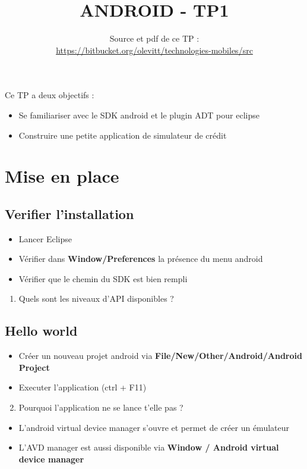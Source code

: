 \documentclass{article}
\title{ANDROID - TP1}
\date{Source et pdf de ce TP
:\\ \href{https://bitbucket.org/olevitt/technologies-mobiles}{https://bitbucket.org/olevitt/technologies-mobiles/src}}
\begin{document}
\maketitle
Ce TP a deux objectifs :
\begin{itemize}
\item Se familiariser avec le SDK android et le plugin ADT pour eclipse
\item Construire une petite application de simulateur de crédit
\end{itemize}
\section{Mise en place}
\subsection{Verifier l'installation}
\begin{itemize}
\item Lancer Eclipse
\item Vérifier dans \textbf{Window/Preferences} la présence du menu android
\item Vérifier que le chemin du SDK est bien rempli
\end{itemize}
\begin{enumerate}
\item Quels sont les niveaux d'API disponibles ?
\end{enumerate}
\subsection{Hello world}
\begin{itemize}
\item Créer un nouveau projet android via \textbf{File/New/Other/Android/Android
Project}
\item Executer l'application (ctrl + F11)
\end{itemize}
\begin{enumerate}
 \setcounter{enumi}{1}
\item Pourquoi l'application ne se lance t'elle pas ?
\end{enumerate}
\begin{itemize}
\item L'android virtual device manager s'ouvre et permet de créer un
émulateur
\item L'AVD manager est aussi disponible via \textbf{Window / Android virtual
device manager}
\end{itemize}
\end{document}
